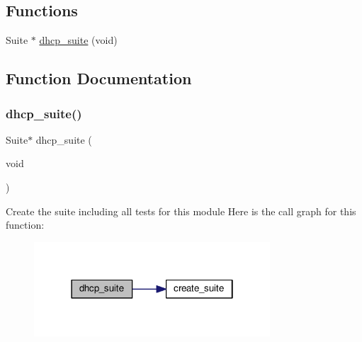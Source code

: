 \subsection*{Functions}
\begin{DoxyCompactItemize}
\item 
Suite $\ast$ \hyperlink{openmote-cc2538_2lwip_2test_2unit_2dhcp_2test__dhcp_8h_af06f3f3e13abed709f20f2669693181f}{dhcp\+\_\+suite} (void)
\end{DoxyCompactItemize}


\subsection{Function Documentation}
\mbox{\label{openmote-cc2538_2lwip_2test_2unit_2dhcp_2test__dhcp_8h_af06f3f3e13abed709f20f2669693181f}} 
\subsubsection{\texorpdfstring{dhcp\+\_\+suite()}{dhcp\_suite()}}
{\footnotesize\ttfamily Suite$\ast$ dhcp\+\_\+suite (\begin{DoxyParamCaption}\item[{void}]{ }\end{DoxyParamCaption})}

Create the suite including all tests for this module Here is the call graph for this function\+:
\nopagebreak
\begin{figure}[H]
\begin{center}
\leavevmode
\includegraphics[width=250pt]{openmote-cc2538_2lwip_2test_2unit_2dhcp_2test__dhcp_8h_af06f3f3e13abed709f20f2669693181f_cgraph}
\end{center}
\end{figure}
